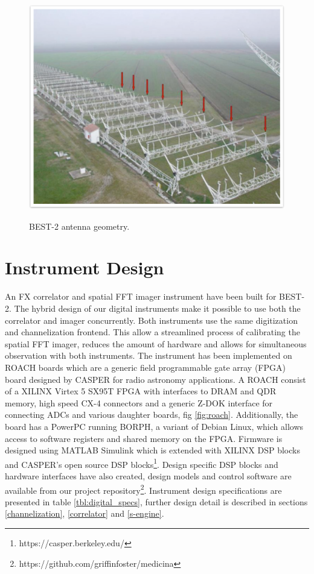 \documentclass[useAMS,macros,usenatbib,onecolumn]{mn2e}
\begin{document}
\begin{figure}
{    \includegraphics[scale=0.4]{graphics/best2.pdf}
    \label{fig:best2}
    }
    \caption{BEST-2 antenna geometry.}
    \label{fig:array_layout}
\end{figure}

\section{Instrument Design}
\label{instrument design}

An FX correlator and spatial FFT imager instrument have been built for BEST-2.
The hybrid design of our digital instruments make it possible to use both the correlator and imager concurrently.
Both instruments use the same digitization and channelization frontend.
This allow a streamlined process of calibrating the spatial FFT imager, reduces the amount of hardware and allows for simultaneous observation with both instruments.
The instrument has been implemented on ROACH boards which are a generic field programmable gate array (FPGA) board designed by CASPER for radio astronomy applications.
A ROACH consist of a XILINX Virtex 5 SX95T FPGA with interfaces to DRAM and QDR memory, high speed CX-4 connectors and a generic Z-DOK interface for connecting ADCs and various daughter boards, fig \ref{fig:roach}.
Additionally, the board has a PowerPC running BORPH, a variant of Debian Linux, which allows access to software registers and shared memory on the FPGA.
Firmware is designed using MATLAB Simulink which is extended with XILINX DSP blocks and CASPER's open source DSP blocks\footnote{https://casper.berkeley.edu/}.
Design specific DSP blocks and hardware interfaces have also created, design models and control software are available from our project repository\footnote{https://github.com/griffinfoster/medicina}.
Instrument design specifications are presented in table \ref{tbl:digital_specs}, further design detail is described in sections \ref{channelization}, \ref{correlator} and \ref{s-engine}.
\end{document}
